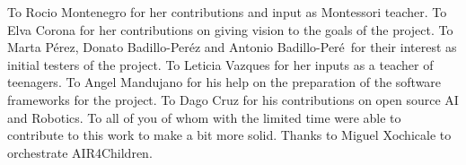 \documentclass[sigconf]{acmart}
\begin{document}
\begin{acks}
To Rocio Montenegro for her contributions and input as Montessori teacher. 
To Elva Corona for her contributions on giving vision to the goals of the project. 
To Marta P\'erez, Donato Badillo-Per\'ez and Antonio Badillo-Per\'e\ for their interest as initial testers of the project. 
To Leticia Vazques for her inputs as a teacher of teenagers. 
To Angel Mandujano for his help on the preparation of the software frameworks for the project. 
To Dago Cruz for his contributions on open source AI and Robotics.
To all of you of whom with the limited time were able to contribute to this work to make a bit more solid.
Thanks to Miguel Xochicale to orchestrate AIR4Children.
\end{acks}



\end{document}
